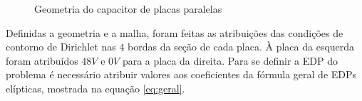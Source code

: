 \documentclass[
    12pt,               %
    openright,          %
    oneside,
    a4paper,            %
    english,            %
    french,             %
    spanish,            %
    brazil              %
    ]{abntex2}
\begin{document}
\begin{figure}
	\qquad
	\caption{Geometria do capacitor de placas paralelas}%
	\label{fig:mesh}%
\end{figure}

Definidas a geometria e a malha, foram feitas as atribuições das condições de contorno de Dirichlet nas $4$ bordas da seção de cada placa. À placa da esquerda foram atribuídos $48V$ e $0V$ para a placa da direita. Para se definir a EDP do problema é necessário atribuir valores aos coeficientes da fórmula geral de EDPs elípticas, mostrada na equação \ref{eq:geral}.
\end{document}

